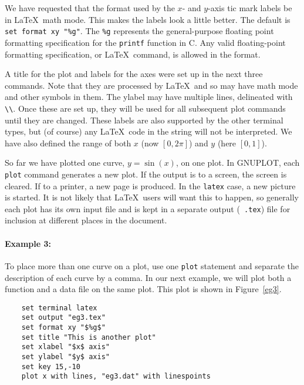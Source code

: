 We have requested that the format used by the $x$- and $y$-axis tic
mark labels be in \LaTeX\ math mode. This makes the labels look a
little better. The default is \verb+set format xy "%g"+. The \verb+%g+
represents the general-purpose floating point formatting specification
for the {\tt printf} function in C. Any valid floating-point
formatting specification, or \LaTeX\ command, is allowed in the
format.

A title for the plot and labels for the axes were set up in the next
three commands.  Note that they are processed by \LaTeX\ and so may
have math mode and other symbols in them. The ylabel may have multiple
lines, delineated with \verb+\\+.  Once these are set up, they will be
used for all subsequent plot commands until they are changed. These
labels are also supported by the other terminal types, but (of course)
any \LaTeX\ code in the string will not be interpreted. We have also
defined the range of both $x$ (now $[0,2\pi]$) and $y$ (here $[0,1]$).

So far we have plotted one curve, $y=\sin(x)$, on one plot. In
GNUPLOT, each {\tt plot} command generates a new plot. If the output
is to a screen, the screen is cleared. If to a printer, a new page is
produced. In the {\tt latex} case, a new picture is started. It is not
likely that \LaTeX\ users will want this to happen, so generally each
plot has its own input file and is kept in a separate output ({\tt
.tex}) file for inclusion at different places in the document.

\paragraph{Example 3:} To place more than one curve on a plot, use one
{\tt plot} statement and separate the description of each curve by a
comma. In our next example, we will plot both a function and a data
file on the same plot. This plot is shown in Figure~\ref{eg3}.

\singlespace
\begin{verbatim}
    set terminal latex
    set output "eg3.tex"
    set format xy "$%g$"
    set title "This is another plot"
    set xlabel "$x$ axis"
    set ylabel "$y$ axis"
    set key 15,-10
    plot x with lines, "eg3.dat" with linespoints
\end{verbatim}
\currentspace


